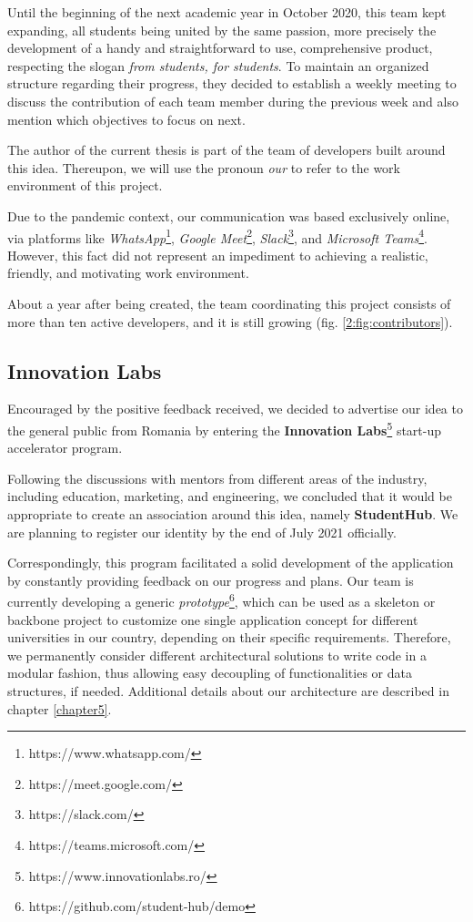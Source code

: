    Until the beginning of the next academic year in October 2020, this team kept expanding, all students being united by the same passion, more precisely the development of a handy and straightforward to use, comprehensive product, respecting the slogan \textit{from students, for students}. To maintain an organized structure regarding their progress, they decided to establish a weekly meeting to discuss the contribution of each team member during the previous week and also mention which objectives to focus on next.
    
    The author of the current thesis is part of the team of developers built around this idea. Thereupon, we will use the pronoun \textit{our} to refer to the work environment of this project.
    
    Due to the pandemic context, our communication was based exclusively online, via platforms like \textit{WhatsApp}\footnote{https://www.whatsapp.com/}, \textit{Google Meet}\footnote{https://meet.google.com/}, \textit{Slack}\footnote{https://slack.com/}, and \textit{Microsoft Teams}\footnote{https://teams.microsoft.com/}. However, this fact did not represent an impediment to achieving a realistic, friendly, and motivating work environment.
    
    About a year after being created, the team coordinating this project consists of more than ten active developers, and it is still growing (fig. \ref{2:fig:contributors}).
    
\subsection{Innovation Labs} \label{1:innovation_labs}

    Encouraged by the positive feedback received, we decided to advertise our idea to the general public from Romania by entering the \textbf{Innovation Labs}\footnote{https://www.innovationlabs.ro/} start-up accelerator program.
    
    Following the discussions with mentors from different areas of the industry, including education, marketing, and engineering, we concluded that it would be appropriate to create an association around this idea, namely \textbf{StudentHub}. We are planning to register our identity by the end of July 2021 officially.
    
    Correspondingly, this program facilitated a solid development of the application by constantly providing feedback on our progress and plans. Our team is currently developing a generic \textit{prototype}\footnote{https://github.com/student-hub/demo}, which can be used as a skeleton or backbone project to customize one single application concept for different universities in our country, depending on their specific requirements. Therefore, we permanently consider different architectural solutions to write code in a modular fashion, thus allowing easy decoupling of functionalities or data structures, if needed. Additional details about our architecture are described in chapter \ref{chapter5}. 
        
